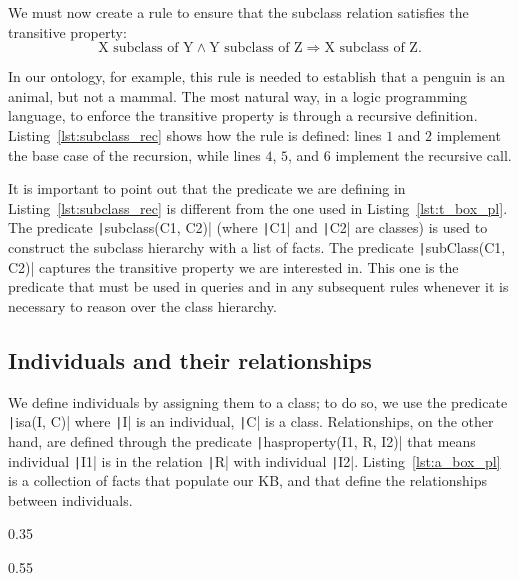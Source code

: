 We must now create a rule to ensure that the subclass relation satisfies the transitive property:
\[
\text{X subclass of Y}\land\text{Y subclass of Z}\Rightarrow\text{X subclass of Z.}
\]

In our ontology, for example,  this rule is needed to establish that a penguin is an animal, but not a mammal. The most natural way, in a logic programming language, to enforce the transitive property is through a recursive definition. Listing~\ref{lst:subclass_rec} shows how the rule is defined: lines $1$ and $2$ implement the base case of the recursion, while lines $4$, $5$, and $6$ implement the recursive call.

\begin{listing}[h]
	\caption{Recursive definition of subclass predicate}
	\label{lst:subclass_rec}
\end{listing}

It is important to point out that the predicate we are defining in Listing~\ref{lst:subclass_rec} is different from the one used in Listing~\ref{lst:t_box_pl}. The predicate \texttt|subclass(C1, C2)| (where \texttt|C1| and \texttt|C2| are classes) is used to construct the subclass hierarchy with a list of facts. The predicate \texttt|subClass(C1, C2)| captures the transitive property we are interested in. This one is the predicate that must be used in queries and in any subsequent rules whenever it is necessary to reason over the class hierarchy.

\subsection{Individuals and their relationships}
We define individuals by assigning them to a class; to do so, we use the predicate \texttt|isa(I, C)| where \texttt|I| is an individual, \texttt|C| is a class. Relationships, on the other hand, are defined through the predicate \texttt|hasproperty(I1, R, I2)| that means individual \texttt|I1| is in the relation \texttt|R| with individual \texttt|I2|. Listing~\ref{lst:a_box_pl} is a collection of facts that populate our KB, and that define the relationships between individuals.

\begin{listing}[h]
	\centering
	\begin{sublisting}[c]{0.35\linewidth}
		\caption{Individuals definitions}
		\label{lst:a_box_pl_ind}
	\end{sublisting}
	\qquad
	\begin{sublisting}[c]{0.55\linewidth}
		\caption{Relationships definitions}
		\label{lst:a_box_pl_rel}
	\end{sublisting}
	\caption{A-Box definition}
	\label{lst:a_box_pl}
\end{listing}



